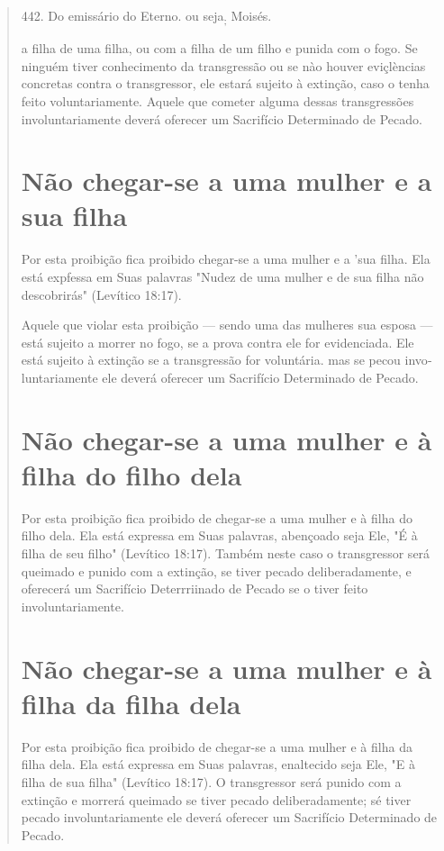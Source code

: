 \begin{quote}
442. Do emissário do Eterno. ou seja\textsubscript{;} Moisés.

a filha de uma filha, ou com a filha de um filho e punida com o fogo. Se
nin­guém tiver conhecimento da transgressão ou se nào houver eviçlèncias
concre­tas contra o transgressor, ele estará sujeito à extinção, caso o
tenha feito volun­tariamente. Aquele que cometer alguma dessas
transgressões involuntariamen­te deverá oferecer um Sacrifício
Determinado de Pecado.

\section{Não chegar-se a uma mulher e a sua filha}

Por esta proibição fica proibido chegar-se a uma mulher e a 'sua fi­lha.
Ela está expfessa em Suas palavras "Nudez de uma mulher e de sua filha
não descobrirás" (Levítico 18:17).

Aquele que violar esta proibição --- sendo uma das mulheres sua es­posa
--- está sujeito a morrer no fogo, se a prova contra ele for
evidenciada. Ele está sujeito à extinção se a transgressão for
voluntária. mas se pecou invo­luntariamente ele deverá oferecer um
Sacrifício Determinado de Pecado.

\section{Não chegar-se a uma mulher e à filha do filho dela}

Por esta proibição fica proibido de chegar-se a uma mulher e à filha do
filho dela. Ela está expressa em Suas palavras, abençoado seja Ele, "É à
filha de seu filho" (Levítico 18:17). Também neste caso o transgressor
será queima­do e punido com a extinção, se tiver pecado deliberadamente,
e oferecerá um Sacrifício Deterrriinado de Pecado se o tiver feito
involuntariamente.

\section{Não chegar-se a uma mulher e à filha da filha dela}

Por esta proibição fica proibido de chegar-se a uma mulher e à filha da
filha dela. Ela está expressa em Suas palavras, enaltecido seja Ele, "E
à filha de sua filha" (Levítico 18:17). O transgressor será punido com a
extinção e mor­rerá queimado se tiver pecado deliberadamente; sé tiver
pecado involuntaria­mente ele deverá oferecer um Sacrifício Determinado
de Pecado.


\end{quote}
